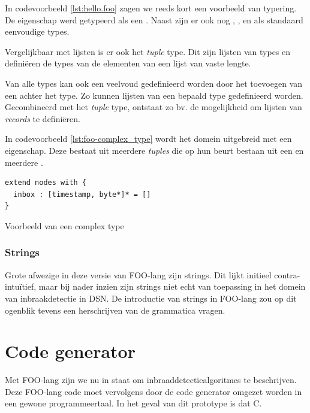In codevoorbeeld \ref{lst:hello.foo} zagen we reeds kort een voorbeeld van typering.
De  eigenschap werd getypeerd als een . Naast
 zijn er ook nog , ,  en
 als standaard eenvoudige types.

Vergelijkbaar met lijsten is er ook het \emph{tuple} type. Dit zijn lijsten van
types en defini\"eren de types van de elementen van een lijst van vaste lengte.

Van alle types kan ook een veelvoud gedefinieerd worden door het toevoegen van
een \ttt{*} achter het type. Zo kunnen lijsten van een bepaald type
gedefinieerd worden. Gecombineerd met het \emph{tuple} type, ontstaat zo bv. de
mogelijkheid om lijsten van \emph{records} te defini\"eren.

In codevoorbeeld \ref{lst:foo-complex_type} wordt het  domein uitgebreid
met een  eigenschap. Deze bestaat uit meerdere \emph{tuples} die op
hun beurt bestaan uit een  en meerdere .

\begin{listing}[ht]
  \begin{verbatim}
extend nodes with {
  inbox : [timestamp, byte*]* = []
}
  \end{verbatim}
  \vspace{-5mm}
  \caption{Voorbeeld van een complex type}
  \label{lst:foo-complex_type}
\end{listing}

\subsubsection{Strings}

Grote afwezige in deze versie van FOO-lang zijn strings. Dit lijkt initieel
contra-intu\"itief, maar bij nader inzien zijn strings niet echt van toepassing
in het domein van inbraakdetectie in DSN. De introductie van strings in
FOO-lang zou op dit ogenblik tevens een herschrijven van de grammatica vragen.

\section{Code generator}
\label{section:devel-codegen}

Met FOO-lang zijn we nu in staat om inbraaddetectiealgoritmes te beschrijven.
Deze FOO-lang code moet vervolgens door de code generator omgezet worden in een
gewone programmeertaal. In het geval van dit prototype is dat C.

